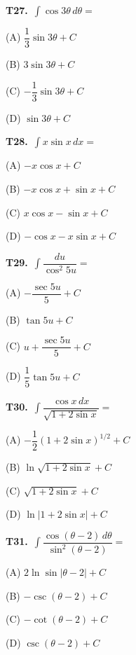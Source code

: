 \documentclass[11pt]{article}
\begin{document}
\bigskip\noindent\textbf{T27.}\ $\displaystyle\int \cos 3\theta\,d\theta =$
\begin{list}{}{\setlength{\leftmargin}{3em}\setlength{\labelwidth}{2.5em}\setlength{\itemsep}{0pt}\setlength{\topsep}{2pt}}
\item[(A)] $\dfrac{1}{3}\sin 3\theta+C$
\item[(B)] $3\sin 3\theta+C$
\item[(C)] $-\dfrac{1}{3}\sin 3\theta+C$
\item[(D)] $\sin 3\theta+C$
\end{list}

\bigskip\noindent\textbf{T28.}\ $\displaystyle\int x\sin x\,dx =$
\begin{list}{}{\setlength{\leftmargin}{3em}\setlength{\labelwidth}{2.5em}\setlength{\itemsep}{0pt}\setlength{\topsep}{2pt}}
\item[(A)] $-x\cos x+C$
\item[(B)] $-x\cos x+\sin x+C$
\item[(C)] $x\cos x-\sin x+C$
\item[(D)] $-\cos x-x\sin x+C$
\end{list}

\bigskip\noindent\textbf{T29.}\ $\displaystyle\int \dfrac{du}{\cos^2 5u} =$
\begin{list}{}{\setlength{\leftmargin}{3em}\setlength{\labelwidth}{2.5em}\setlength{\itemsep}{0pt}\setlength{\topsep}{2pt}}
\item[(A)] $-\dfrac{\sec 5u}{5}+C$
\item[(B)] $\tan 5u+C$
\item[(C)] $u+\dfrac{\sec 5u}{5}+C$
\item[(D)] $\dfrac{1}{5}\tan 5u+C$
\end{list}

\bigskip\noindent\textbf{T30.}\ $\displaystyle\int \dfrac{\cos x\,dx}{\sqrt{1+2\sin x}} =$
\begin{list}{}{\setlength{\leftmargin}{3em}\setlength{\labelwidth}{2.5em}\setlength{\itemsep}{0pt}\setlength{\topsep}{2pt}}
\item[(A)] $-\dfrac{1}{2}(1+2\sin x)^{1/2}+C$
\item[(B)] $\ln\sqrt{1+2\sin x}+C$
\item[(C)] $\sqrt{1+2\sin x}+C$
\item[(D)] $\ln|1+2\sin x|+C$
\end{list}

\bigskip\noindent\textbf{T31.}\ $\displaystyle\int \dfrac{\cos(\theta-2)\,d\theta}{\sin^2(\theta-2)} =$
\begin{list}{}{\setlength{\leftmargin}{3em}\setlength{\labelwidth}{2.5em}\setlength{\itemsep}{0pt}\setlength{\topsep}{2pt}}
\item[(A)] $2\ln\sin|\theta-2|+C$
\item[(B)] $-\csc(\theta-2)+C$
\item[(C)] $-\cot(\theta-2)+C$
\item[(D)] $\csc(\theta-2)+C$
\end{list}
\end{document}
